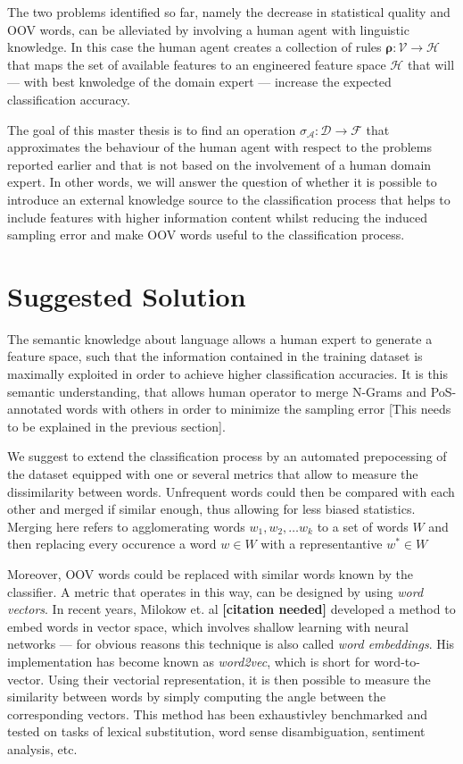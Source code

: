 The two problems identified so far, namely the decrease in
statistical quality and OOV words, can be alleviated by involving a human agent
with linguistic knowledge. 
In this case the human agent creates a collection of rules $\boldsymbol\rho:
\mathcal{V} \to \mathcal{H}$ that maps the set of available features to an engineered
feature space $\mathcal{H}$ that will --- with best knwoledge of the domain
expert --- increase the expected classification accuracy.

The goal of this master thesis is to find an operation
$\sigma_{\mathcal{A}}: \mathcal{D} \to \mathcal{F}$ that approximates the
behaviour of the human agent with respect to the problems reported earlier and 
that is not based on the involvement of a human domain expert. In other words,
we will answer the question of whether it is possible to introduce an external
knowledge source to the classification process that helps to include features 
with higher information content whilst reducing the induced sampling
error and make OOV words useful to the classification process.

\section{Suggested Solution}

The semantic knowledge about language allows a human expert to generate a
feature space, such that the information contained in the training dataset is
maximally exploited in order to achieve higher classification accuracies. It is
this semantic understanding, that allows human operator to merge N-Grams and
PoS-annotated words with others in order to minimize the sampling error [This
needs to be explained in the previous section].
 
We suggest to extend the classification process by an automated prepocessing of
the dataset equipped with one or several metrics that allow to measure the
dissimilarity between words. Unfrequent words could then be compared with each other and
merged if similar enough, thus allowing for less biased statistics. 
Merging here refers to agglomerating words $w_1, w_2, \ldots w_k$ to a set
of words $W$ and then replacing every occurence a word $w \in W$ with
a representantive $w^* \in W$

Moreover, OOV words could be replaced with similar words known by the
classifier.
A metric that operates in this way, can be designed by using \textit{word
vectors}. In recent years, Milokow et. al \textbf{[citation needed]} developed a method
to embed words in vector space, which involves shallow learning with neural
networks --- for obvious reasons this technique is also called \textit{word embeddings}. His
implementation has become known as \emph{word2vec}, which is short for
word-to-vector. Using their  vectorial representation, it is then possible to
measure the similarity between words by simply computing the angle between the
corresponding vectors. This method has been exhaustivley benchmarked and tested
on tasks of lexical substitution, word sense disambiguation, sentiment
analysis, etc. 

